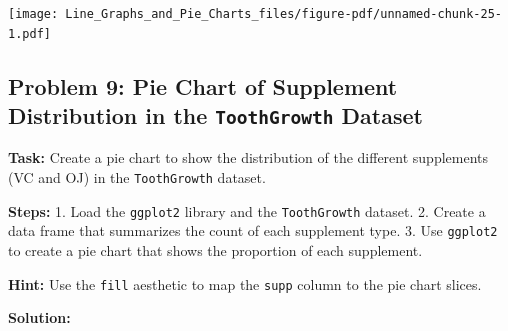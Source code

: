 \documentclass[
  letterpaper,
  DIV=11,
  numbers=noendperiod]{scrreprt}
\newenvironment{Shaded}{\begin{snugshade}}{\end{snugshade}}
\newcommand{\AttributeTok}[1]{\textcolor[rgb]{0.40,0.45,0.13}{#1}}
\newcommand{\CommentTok}[1]{\textcolor[rgb]{0.37,0.37,0.37}{#1}}
\newcommand{\DecValTok}[1]{\textcolor[rgb]{0.68,0.00,0.00}{#1}}
\newcommand{\FunctionTok}[1]{\textcolor[rgb]{0.28,0.35,0.67}{#1}}
\newcommand{\NormalTok}[1]{\textcolor[rgb]{0.00,0.23,0.31}{#1}}
\newcommand{\OtherTok}[1]{\textcolor[rgb]{0.00,0.23,0.31}{#1}}
\newcommand{\SpecialCharTok}[1]{\textcolor[rgb]{0.37,0.37,0.37}{#1}}
\newcommand{\StringTok}[1]{\textcolor[rgb]{0.13,0.47,0.30}{#1}}
\begin{document}
\texttt{[image: Line\_Graphs\_and\_Pie\_Charts\_files/figure-pdf/unnamed-chunk-25-1.pdf]}

\subsection*{\texorpdfstring{Problem 9: Pie Chart of Supplement
Distribution in the \texttt{ToothGrowth}
Dataset}{Problem 9: Pie Chart of Supplement Distribution in the ToothGrowth Dataset}}\label{problem-9-pie-chart-of-supplement-distribution-in-the-toothgrowth-dataset}

\textbf{Task:} Create a pie chart to show the distribution of the
different supplements (VC and OJ) in the \texttt{ToothGrowth} dataset.

\textbf{Steps:} 1. Load the \texttt{ggplot2} library and the
\texttt{ToothGrowth} dataset. 2. Create a data frame that summarizes the
count of each supplement type. 3. Use \texttt{ggplot2} to create a pie
chart that shows the proportion of each supplement.

\textbf{Hint:} Use the \texttt{fill} aesthetic to map the \texttt{supp}
column to the pie chart slices.

\textbf{Solution:}

\begin{Shaded}
\end{Shaded}
\end{document}
